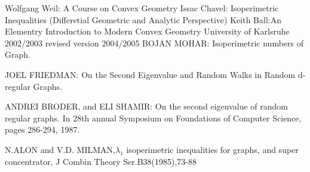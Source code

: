 \documentclass[oneside]{book}
\begin{document}
  
\begin{thebibliography}{300}
 \label{t:21} 
Wolfgang Weil: A Course
on
Convex Geometry
Issac Chavel: Isoperimetric Inequalities (Differetial Geometric and Analytic Perspective)
Keith Ball:An Elementry Introduction to Modern Convex Geometry
University of Karlsruhe
2002/2003
revised version 2004/2005
     BOJAN MOHAR: Isoperimetric numbers of Graph.
     
    
     JOEL FRIEDMAN: On the Second Eigenvalue and Random Walks in Random d-regular Graphs.
     
     ANDREI BRODER, and ELI SHAMIR: On the second eigenvalue of random regular graphs. In 28th annual Symposium on Foundations of Computer Science, pages 286-294, 1987. 
     
      N.ALON and V.D. MILMAN,$\lambda_{1}$ isoperimetric inequalities for graphs, and super concentrator, J Combin Theory Ser.B38(1985),73-88  
  \end{thebibliography}  
    
       
    
 
 
 
 
 
 
     
       
       
       
       
       
       
       
       
       
       
       
       
       
       
       
       
       
       
       
       
       
       
       
       
       
       
       
       
       
       
       
       
       
       
       
       
       
       
       
       
       
       
       
       
       
       
       
       
       
       
       
       
       
       
       
       
       
       
       
       
       
       
       
       
       
       
       
       
       
       
       
     
\end{document}
